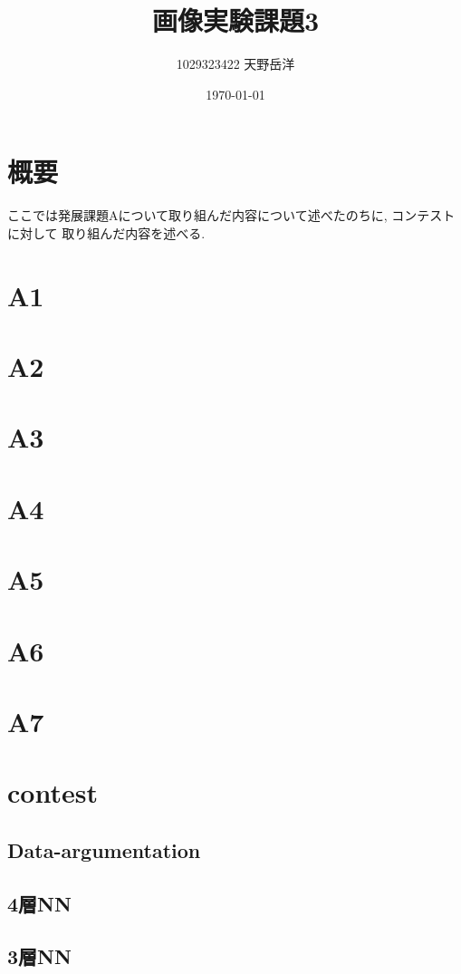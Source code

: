 \documentclass[a4paper,11pt]{jsarticle}
\begin{document}
\title{画像実験課題3}
\author{1029323422 天野岳洋}
\date{\today}
\maketitle
\clearpage

\section{概要}
ここでは発展課題Aについて取り組んだ内容について述べたのちに, コンテストに対して
取り組んだ内容を述べる.

\section{A1}
\section{A2}
\section{A3}
\section{A4}
\section{A5}
\section{A6}
\section{A7}

\section{contest}
\subsection{Data-argumentation}
\subsection{}
\subsection{4層NN}
\subsection{3層NN}
\end{document}
